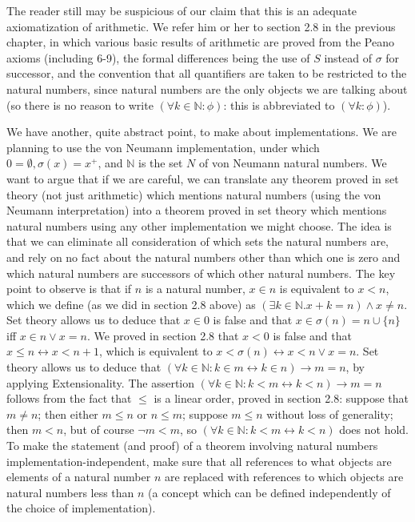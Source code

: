 \documentclass[12pt]{book}
\begin{document}
The reader still may be suspicious of our claim that this is an adequate axiomatization of arithmetic.  We refer him or her to section 2.8 in the previous chapter, in which various basic results of arithmetic are proved from the Peano axioms (including 6-9), the formal differences being the use of $S$ instead of $\sigma$ for successor, and the convention that all quantifiers are taken to be restricted to the natural numbers, since natural numbers are the only objects we are talking about (so there is no reason to write $(\forall k \in {\mathbb N}:\phi)$:  this is abbreviated to $(\forall k :\phi)$).

We have another, quite abstract point, to make about implementations.  We are planning to use the von Neumann implementation, under which $0=\emptyset, \sigma(x)=x^+$,
and $\mathbb N$ is the set $N$ of von Neumann natural numbers.  We want to argue that if we are careful, we can translate any theorem proved in set theory (not just arithmetic) which mentions natural numbers (using the von Neumann interpretation) into a theorem proved in set theory which mentions natural numbers using any other implementation we might choose.  The idea is that we can eliminate all consideration of which sets the natural numbers are, and rely on no fact about the natural numbers other than which one is zero and which natural numbers are successors of which other natural numbers.  The key point to observe is that if $n$ is a natural number, $x \in n$ is equivalent to $x < n$, which we define
(as we did in section 2.8 above) as $(\exists k\in {\mathbb N}.x+k = n) \wedge x \neq n$.   Set theory allows us to deduce that $x \in 0$ is false and that $x \in \sigma(n) = n \cup \{n\}$ iff $x \in n \vee x = n$.  We proved in section 2.8 that $x<0$ is false and that $x \leq n \leftrightarrow x < n+1$, which is equivalent to $x<\sigma(n) \leftrightarrow x<n \vee x=n$.  Set theory allows us to deduce that $(\forall k \in {\mathbb N}:k \in m \leftrightarrow k \in n) \rightarrow m=n$, by applying Extensionality.  The assertion $(\forall k \in {\mathbb N}:k<m \leftrightarrow k<n) \rightarrow m=n$ follows from the fact that $\leq$ is a linear order, proved in section 2.8:  suppose that $m \neq n$;  then either $m \leq n$ or $n \leq m$;  suppose $m \leq n$ without loss of generality;  then $m<n$, but of course $\neg m<m$, so $(\forall k \in {\mathbb N}:k<m \leftrightarrow k<n)$ does not hold.  To make the statement (and proof) of a theorem involving natural numbers implementation-independent, make sure that all references to what objects are elements of a natural number $n$ are replaced with references to which objects are natural numbers less than $n$ (a concept which can be defined independently of the choice of implementation).
\end{document}
